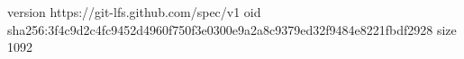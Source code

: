 version https://git-lfs.github.com/spec/v1
oid sha256:3f4c9d2c4fc9452d4960f750f3e0300e9a2a8c9379ed32f9484e8221fbdf2928
size 1092
